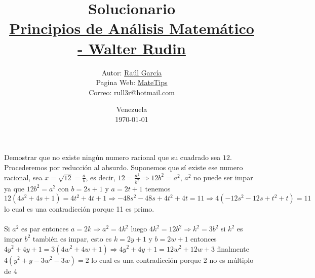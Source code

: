 \documentclass[10pt,a4paper]{jhwhw}
\author{Autor: \href{https://www.facebook.com/ruller}{Raúl García}\\Pagina Web: \href{https://rull3r.github.io/}{MateTips}\\Correo: rull3r@hotmail.com}
\date{Venezuela\\ \today \\}
\title{Solucionario \\\href{https://books.google.co.ve/books?id=i4aToAEACAAJ}{Principios de Análisis Matemático - Walter Rudin}\\}
\begin{document}
	
	\problema{ }\label{pro:2}
	Demostrar que no existe ningún numero racional que su cuadrado sea $12$.
	\solution 
	Procederemos por reducción al absurdo. Suponemos que sí existe ese numero racional, sea $x=\sqrt{12}=\frac{a}{b}$, es decir, $12=\frac{a^2}{b^2}\Rightarrow12b^2=a^2$, $a^2$ no puede ser impar ya que $12b^2=a^2$ con $b=2s+1$ y $a=2t+1$ tenemos $12(4s^2+4s+1)=4t^2+4t+1\Rightarrow -48s^2-48s+4t^2+4t=11\Rightarrow 4(-12s^2-12s+t^2+t)=11$ lo cual es una contradicción porque 11 es primo.\\\\
	Si $a^2$ es par entonces $a=2k\Rightarrow a^2=4k^2$ luego $4k^2=12b^2\Rightarrow k^2=3b^2$ si $k^2$ es impar $b^2$ también es impar, esto es $k=2y+1$ y $b=2w+1$ entonces $4y^2+4y+1=3(4w^2+4w+1)\Rightarrow 4y^2+4y+1=12w^2+12w+3$ finalmente $4(y^2+y-3w^2-3w)=2$ lo cual es una contradicción porque 2 no es múltiplo de 4 \QEPD
	
\end{document}
